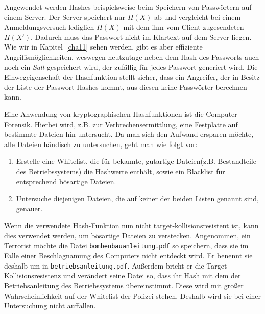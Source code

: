 \begin{beispiel}\indexPreImageResistance
Angewendet werden Hashes beispielsweise beim Speichern von
Passwörtern auf einem Server. Der Server speichert nur $H(X)$ ab und
vergleicht bei einem Anmeldungsversuch lediglich $H(X)$ mit dem ihm vom
Client zugesendeten $H(X')$. Dadurch muss das Passwort nicht im Klartext
auf dem Server liegen. Wie wir in Kapitel~\ref{cha11} sehen werden, gibt
es aber effiziente Angriffsmöglichkeiten, weswegen heutzutage neben dem
Hash des Passworts auch noch ein \emph{Salt} gespeichert wird, der
zufällig für jedes Passwort generiert wird.
Die Einwegeigenschaft der Hashfunktion stellt sicher, dass ein
Angreifer, der in Besitz der Liste der Passwort-Hashes kommt, aus
diesen keine Passwörter berechnen kann.
\end{beispiel}

\begin{beispiel}\indexTargetCollisionResistance
Eine Anwendung von kryptographischen Hashfunktionen ist die
Computer-Forensik. Hierbei wird, z.B. zur Verbrechensermittlung, eine
Festplatte auf bestimmte Dateien hin untersucht. Da man sich den Aufwand
ersparen möchte, alle Dateien händisch zu untersuchen, geht man wie
folgt vor:
\begin{enumerate}
  \item Erstelle eine Whitelist, die für bekannte, gutartige
    Dateien(z.B. Bestandteile des Betriebssystems) die Hashwerte
    enthält, sowie ein Blacklist für entsprechend bösartige Dateien.
  \item Untersuche diejenigen Dateien, die auf keiner der beiden Listen
    genannt sind, genauer.
\end{enumerate}

Wenn die verwendete Hash-Funktion nun nicht target-kollisionsresistent
ist, kann dies verwendet werden, um bösartige Dateien zu
verstecken. Angenommen, ein Terrorist möchte die Datei
\texttt{bombenbauanleitung.pdf} so speichern, dass sie im Falle einer
Beschlagnamung des Computers nicht entdeckt wird. Er benennt sie deshalb
um in \texttt{betriebsanleitung.pdf}. Außerdem bricht er die
Target-Kollisionsresistenz und verändert seine Datei so, dass ihr Hash
mit dem der Betriebsanleitung des Betriebssystems übereinstimmt. Diese
wird mit großer Wahrscheinlichkeit auf der Whitelist der Polizei
stehen. Deshalb wird sie bei einer Untersuchung nicht
auffallen\cite{Stevens2012}.
\end{beispiel}
